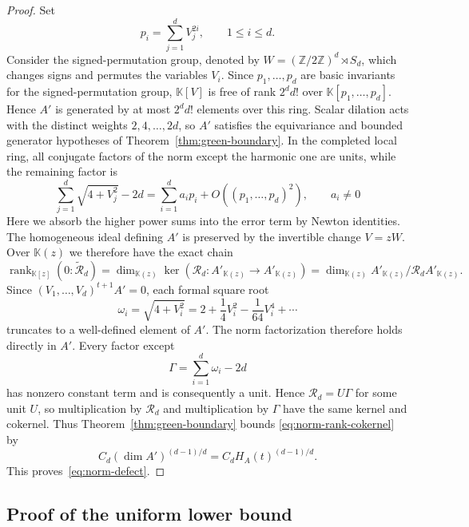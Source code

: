 \documentclass[11pt,reqno]{amsart}
\newcommand\K{\ensuremath{\mathbb{K}}}
\theoremstyle{definition}
\theoremstyle{plain}
\numberwithin{equation}{section}
\begin{document}
\begin{proof}
Set
\[
 p_i=\sum_{j=1}^dV_j^{2i},\qquad 1\le i\le d.
\]
Consider the signed-permutation group, denoted by $W=(\mathbb Z/2\mathbb Z)^d\rtimes S_d$, which changes signs and
permutes the variables $V_i$. Since $p_1,\ldots,p_d$ are basic invariants for the signed-permutation
group, $\mathbb K[V]$ is free of rank $2^d d!$ over
$\mathbb K[p_1,\ldots,p_d]$. Hence $A'$ is generated by at most
$2^d d!$ elements over this ring.
Scalar dilation acts with the distinct
weights $2,4,\ldots,2d$, so $A'$ satisfies the equivariance and bounded
generator hypotheses of Theorem~\ref{thm:green-boundary}.  In the completed
local ring, all conjugate factors of the norm except the harmonic one are
units, while the remaining factor is
\begin{equation}\label{eq:norm-linearization}
 \sum_{j=1}^d\sqrt{4+V_j^2}-2d
   =\sum_{i=1}^da_ip_i+O((p_1,\ldots,p_d)^2),
 \qquad a_i\ne0
\end{equation}
Here we absorb the higher power sums into the error term by Newton identities.
The homogeneous ideal defining $A'$ is preserved by the invertible change
$V=zW$.  Over $\K(z)$ we therefore have the exact chain
\begin{equation}\label{eq:norm-rank-cokernel}
 \operatorname{rank}_{\K[z]}(0:\widetilde{\mathcal R}_d)
 =\dim_{\K(z)}\ker(\mathcal R_d:A'_{\K(z)}\to A'_{\K(z)})
 =\dim_{\K(z)}A'_{\K(z)}/\mathcal R_dA'_{\K(z)}.
\end{equation}
Since $(V_1,\ldots,V_d)^{t+1}A'=0$, each formal square root
\begin{equation*}
    \omega_i=\sqrt{4+V_i^2}
    =2+\frac14V_i^2-\frac1{64}V_i^4+\cdots
\end{equation*}
truncates to a well-defined element of $A'$. The norm factorization
therefore holds directly in $A'$. Every factor except
\begin{equation*}
    \Gamma=\sum_{i=1}^d\omega_i-2d
\end{equation*}
has nonzero constant term and is consequently a unit. Hence
$\mathcal R_d=U\Gamma$ for some unit $U$, so multiplication by
$\mathcal R_d$ and multiplication by $\Gamma$ have the same kernel and
cokernel. Thus Theorem~\ref{thm:green-boundary}
bounds \eqref{eq:norm-rank-cokernel} by
\begin{equation*}
    C_d(\dim A')^{(d-1)/d}=C_dH_A(t)^{(d-1)/d}.
\end{equation*}
This proves~\eqref{eq:norm-defect}.
\end{proof}


\subsection{Proof of the uniform lower bound}
\end{document}
